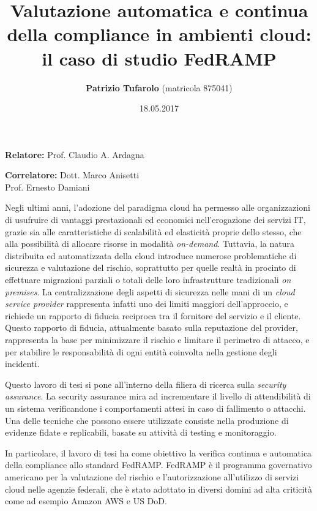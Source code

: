 \documentclass[10pt,a4paper]{article}
\title{Valutazione automatica e continua della compliance in ambienti cloud: il caso di studio FedRAMP}
\author{\textbf{Patrizio Tufarolo} (matricola 875041)}
\date{18.05.2017}
\begin{document}
\maketitle
\begin{multicols}{2}
\textbf{Relatore:} Prof. Claudio A. Ardagna
\begin{flushright}
\textbf{Correlatore:} Dott. Marco Anisetti\\[.1cm]
Prof. Ernesto Damiani
\end{flushright}
\end{multicols}
\justify

Negli ultimi anni, l'adozione del paradigma cloud ha permesso alle organizzazioni di usufruire di vantaggi prestazionali ed economici nell'erogazione dei servizi IT, grazie sia alle caratteristiche di scalabilità ed elasticità proprie dello stesso, che alla possibilità di allocare risorse in modalità \textit{on-demand}.
Tuttavia, la natura distribuita ed automatizzata della cloud introduce numerose problematiche di sicurezza e valutazione del rischio, soprattutto per quelle realtà in procinto di effettuare migrazioni parziali o totali delle loro infrastrutture tradizionali \emph{on premises}.
La centralizzazione degli aspetti di sicurezza nelle mani di un \textit{cloud service provider} rappresenta infatti uno dei limiti maggiori dell'approccio, e richiede un rapporto di fiducia reciproca tra il fornitore del servizio e il cliente. Questo rapporto di fiducia, attualmente basato sulla reputazione del provider, rappresenta la base per minimizzare il rischio e limitare il perimetro di attacco, e per stabilire le responsabilità di ogni entità coinvolta nella gestione degli incidenti.

Questo lavoro di tesi si pone all'interno della filiera di ricerca sulla \textit{security assurance}.
La security assurance mira ad incrementare il livello di attendibilità di un sistema verificandone i comportamenti attesi in caso di fallimento o attacchi.
Una delle tecniche che possono essere utilizzate consiste nella produzione di evidenze fidate e replicabili, basate su attività di testing e monitoraggio.

In particolare, il lavoro di tesi ha come obiettivo la verifica continua e automatica della compliance allo standard FedRAMP.
FedRAMP è il programma governativo americano per la valutazione del rischio e l'autorizzazione all'utilizzo di servizi cloud nelle agenzie federali, che è stato adottato in diversi domini ad alta criticità come ad esempio Amazon AWS e US DoD.
\end{document}
